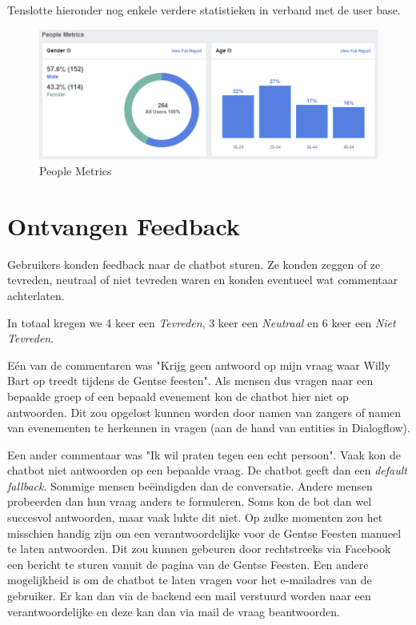 \documentclass[11pt, letterpaper, oneside]{article}
\begin{document}
	Tenslotte hieronder nog enkele verdere statistieken in verband met de user base.
	
	\begin{figure}[h]
		\centering
		\includegraphics[width=0.7\linewidth]{./figuren/people-metrics}
		\caption{People Metrics}
		\label{people-metrics}
	\end{figure}

	\clearpage
	
	\section{Ontvangen Feedback}
	
	Gebruikers konden feedback naar de chatbot sturen. Ze konden zeggen of ze tevreden, neutraal of niet tevreden waren en konden eventueel wat commentaar achterlaten.
	
	In totaal kregen we 4 keer een \textit{Tevreden}, 3 keer een \textit{Neutraal} en 6 keer een \textit{Niet Tevreden}.
	
	Eén van de commentaren was "Krijg geen antwoord op mijn vraag waar Willy Bart  op treedt tijdens de Gentse feesten". Als mensen dus vragen naar een bepaalde groep of een bepaald evenement kon de chatbot hier niet op antwoorden. Dit zou opgelost kunnen worden door namen van zangers of namen van evenementen te herkennen in vragen (aan de hand van entities in Dialogflow).
	
	Een ander commentaar was "Ik wil praten tegen een echt persoon". Vaak kon de chatbot niet antwoorden op een bepaalde vraag. De chatbot geeft dan een \textit{default fallback}. Sommige mensen beëindigden dan de conversatie. Andere mensen probeerden dan hun vraag anders te formuleren. Soms kon de bot dan wel succesvol antwoorden, maar vaak lukte dit niet. Op zulke momenten zou het misschien handig zijn om een verantwoordelijke voor de Gentse Feesten manueel te laten antwoorden. Dit zou kunnen gebeuren door rechtstreeks via Facebook een bericht te sturen vanuit de pagina van de Gentse Feesten. Een andere mogelijkheid is om de chatbot te laten vragen voor het e-mailadres van de gebruiker. Er kan dan via de backend een mail verstuurd worden naar een verantwoordelijke en deze kan dan via mail de vraag beantwoorden.
	
\end{document}

